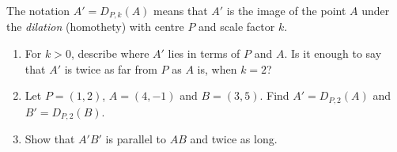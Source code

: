 The notation $A'=D_{P,k}(A)$ means that $A'$ is the image of the point $A$ under the \emph{dilation} (homothety) with centre $P$ and scale factor $k$.
\begin{enumerate}
\item[(a)] For $k>0$, describe where $A'$ lies in terms of $P$ and $A$. Is it enough to say that $A'$ is twice as far from $P$ as $A$ is, when $k=2$?
\item[(b)] Let $P=(1,2)$, $A=(4,-1)$ and $B=(3,5)$. Find $A'=D_{P,2}(A)$ and $B'=D_{P,2}(B)$.
\item[(c)] Show that $A'B'$ is parallel to $AB$ and twice as long.
\end{enumerate}
